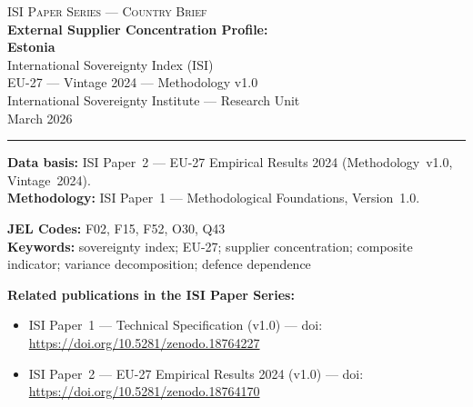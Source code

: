 \documentclass[12pt,a4paper]{article}
\begin{document}
\hypersetup{pageanchor=false}

\begin{titlepage}
\centering
\vspace*{2cm}
{\Large\textsc{ISI Paper Series --- Country Brief}}\\[1.2cm]
{\LARGE\bfseries External Supplier Concentration Profile:\\[0.3em]
Estonia}\\[1.5cm]
{\large International Sovereignty Index (ISI)\\[0.3em]
EU-27 --- Vintage 2024 --- Methodology v1.0}\\[1.2cm]
{\large International Sovereignty Institute --- Research Unit}\\[0.8cm]
{\large March 2026}

\vspace{0.8cm}
\noindent\rule{\textwidth}{0.4pt}
\vspace{0.4cm}

\begin{flushleft}
\noindent\textbf{Data basis:} ISI Paper~2 --- EU-27 Empirical Results 2024 (Methodology~v1.0, Vintage~2024).\\[4pt]
\noindent\textbf{Methodology:} ISI Paper~1 --- Methodological Foundations, Version~1.0.

\medskip

\noindent\textbf{JEL Codes:} F02, F15, F52, O30, Q43\\[4pt]
\noindent\textbf{Keywords:} sovereignty index; EU-27; supplier concentration; composite indicator; variance decomposition; defence dependence

\medskip

\noindent\textbf{Related publications in the ISI Paper Series:}
\begin{itemize}[nosep,leftmargin=1.5em]
\item ISI Paper~1 --- Technical Specification (v1.0) --- doi:\\
  \url{https://doi.org/10.5281/zenodo.18764227}
\item ISI Paper~2 --- EU-27 Empirical Results 2024 (v1.0) --- doi:\\
  \url{https://doi.org/10.5281/zenodo.18764170}
\end{itemize}
\end{flushleft}
\vfill
\end{titlepage}
\end{document}
